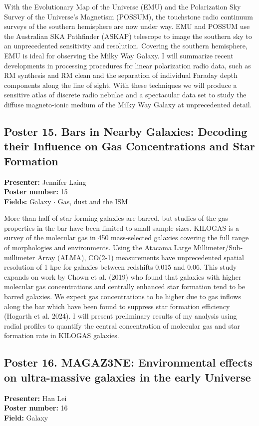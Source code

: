 With the Evolutionary Map of the Universe (EMU) and the Polarization Sky Survey of the Universe's Magnetism (POSSUM), the touchstone radio continuum surveys of the southern hemisphere are now under way. EMU and POSSUM use the Australian SKA Pathfinder (ASKAP) telescope to image the southern sky to an unprecedented sensitivity and resolution. Covering the southern hemisphere, EMU is ideal for observing the Milky Way Galaxy. I will summarize recent developments in processing procedures for linear polarization radio data, such as RM synthesis and RM clean and the separation of individual Faraday depth components along the line of sight. With these techniques we will produce a sensitive atlas of discrete radio nebulae and a spectacular data set to study the diffuse magneto-ionic medium of the Milky Way Galaxy at unprecedented detail.

\hypertarget{poster-abstract-talk-197}{}\label{poster-abstract-page-talk-197}
\subsection*{Poster 15. Bars in Nearby Galaxies: Decoding their Influence on Gas Concentrations and Star Formation}
\textbf{Presenter:} Jennifer Laing\\
\textbf{Poster number:} 15\\
\textbf{Fields:} Galaxy $\cdot$ Gas, dust and the ISM

More than half of star forming galaxies are barred, but studies of the gas properties in the bar have been limited to small sample sizes. KILOGAS is a survey of the molecular gas in 450 mass-selected galaxies covering the full range of morphologies and environments. Using the Atacama Large Millimeter/Sub-millimeter Array (ALMA), CO(2-1) measurements have unprecedented spatial resolution of 1 kpc for galaxies between redshifts 0.015 and 0.06. This study expands on work by Chown et al. (2019) who found that galaxies with higher molecular gas concentrations and centrally enhanced star formation tend to be barred galaxies. We expect gas concentrations to be higher due to gas inflows along the bar which have been found to suppress star formation efficiency (Hogarth et al. 2024). I will present preliminary results of my analysis using radial profiles to quantify the central concentration of molecular gas and star formation rate in KILOGAS galaxies.

\hypertarget{poster-abstract-talk-189}{}\label{poster-abstract-page-talk-189}
\subsection*{Poster 16. MAGAZ3NE: Environmental effects on ultra-massive galaxies in the early Universe}
\textbf{Presenter:} Han Lei\\
\textbf{Poster number:} 16\\
\textbf{Field:} Galaxy

